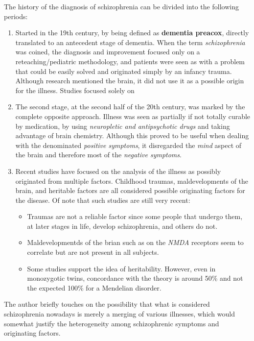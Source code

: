 \documentclass{Paper_Summary}
\begin{document}
    The history of the diagnosis of schizophrenia can be divided into the following periods:
    \begin{enumerate}
        \item Started in the 19th century, by being defined as \textbf{dementia preacox}, directly translated to an antecedent stage of dementia. When the term \emph{schizophrenia} was coined, the diagnosis and improvement focused only on a reteaching/pediatric methodology, and patients were seen as with a problem that could be easily solved and originated simply by an infancy trauma. Although research mentioned the brain, it did not use it as a possible origin for the illness. Studies focused solely on 
        \item The second stage, at the second half of the 20th century, was marked by the complete opposite approach. Illness was seen as partially if not totally curable by medication, by using \emph{neuropletic and antipsychotic drugs} and taking advantage of brain chemistry. Although this proved to be useful when dealing with the denominated \emph{positive symptoms}, it disregarded the \emph{mind} aspect of the brain and therefore most of the \emph{negative symptoms}.
        \item Recent studies have focused on the analysis of the illness as possibly originated from multiple factors. Childhood traumas, maldevelopments of the brain, and heritable factors are all considered possible originating factors for the disease. Of note that such studies are still very recent:
        \begin{itemize}
            \item Traumas are not a reliable factor since some people that undergo them, at later stages in life, develop schizophrenia, and others do not.
            \item Maldevelopmentds of the brian such as on the \emph{NMDA} receptors seem to correlate but are not present in all subjects.
            \item Some studies support the idea of heritability. However, even in monozygotic twins, concordance with the theory is around 50\% and not the expected 100\% for a Mendelian disorder.
        \end{itemize}
    \end{enumerate}
    The author briefly touches on the possibility that what is considered schizophrenia nowadays is merely a merging of various illnesses, which would somewhat justify the heterogeneity among schizophrenic symptoms and originating factors. 
\end{document}
